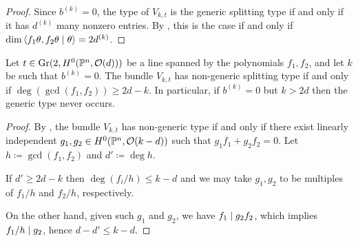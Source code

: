 \begin{proof}
  Since $b^{(k)}=0$, the type of $V_{k,t}$ is the generic splitting type if and only if it has $d^{(k)}$ many nonzero entries.
	By , this is the case if and only if
	$\dim\left\langle f_1\theta,f_2\theta \mid \theta \right\rangle = 2 d^{(k)}$.
\end{proof}

\begin{corollary} \label{nongeneral-type-shared-sections}
	Let $t\in \operatorname{Gr}(2,H^0(\mathbb{P}^n, \mathcal{O}(d)))$ be a line spanned by the polynomials $f_1,f_2$, and let $k$ be such that $b^{(k)}=0$. The bundle $V_{k,t}$ has non-generic splitting type if and only if $\deg(\gcd(f_1,f_2)) \geq 2d-k$. In particular, if $b^{(k)}=0$ but $k>2d$ then the generic type never occurs.
\end{corollary}

\begin{proof}
	By , the bundle $V_{k,t}$ has non-generic type if and only if there exist linearly independent $g_1,g_2\in H^0(\mathbb{P}^n,\mathcal{O}(k-d))$ such that $g_1f_1+g_2f_2 = 0$. Let $h \coloneqq \gcd(f_1,f_2)$ and $d'\coloneqq \deg h$.

	If $d' \geq 2d-k$ then $\deg (f_i/h) \leq k-d$ and we may take $g_1,g_2$ to be multiples of $f_1/h$ and $f_2/h$, respectively.

	On the other hand, given such $g_1$ and $g_2$, we have $f_1\mid g_2 f_2$, which implies $f_1/h \mid g_2$, hence $d-d'\leq k-d$.
\end{proof}


